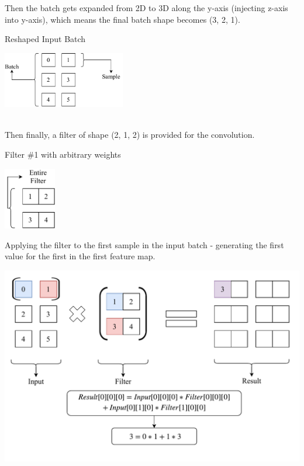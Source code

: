\documentclass[12pt]{article}
\newcommand\tab[1][1cm]{\hspace*{#1}}
\begin{document}
\tab Then the batch gets expanded from 2D to 3D along the y-axis (injecting z-axis into y-axis), \tab which means the final batch shape becomes (3, 2, 1).
\begin{blockfigure}{Reshaped Input Batch}
	\begin{center}
		\includegraphics[width=0.4\textwidth]{input_reshaped}
	\end{center}
\end{blockfigure}\\
\tab Then finally, a filter of shape (2, 1, 2) is provided for the convolution.
\begin{blockfigure}{Filter \#1 with arbitrary weights}
	\begin{center}
		\includegraphics[width=0.17\textwidth]{filter1}
	\end{center}
\end{blockfigure}
\newpage
\begin{blockfigure}{ Applying the filter to the first sample in the input batch - generating the first value for the first  in the first feature map.}
	\begin{center}
		\includegraphics[width=\textwidth]{firstConvSample_step1}
	\end{center}
\end{blockfigure}
\end{document}

